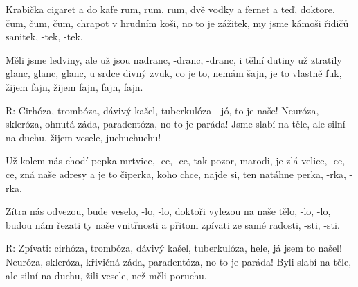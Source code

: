 \resetVars
{}
\MakeHeader
\Lyrics

Krabička cigaret a do kafe rum, rum, rum,
dvě vodky a fernet a teď, doktore, čum, čum, čum,
chrapot v hrudním koši, no to je zážitek,
my jsme kámoši řidičů sanitek, -tek, -tek.

Měli jsme ledviny, ale už jsou nadranc, -dranc, -dranc,
i tělní dutiny už ztratily glanc, glanc, glanc,
u srdce divný zvuk, co je to, nemám šajn,
je to vlastně fuk, žijem fajn, žijem fajn, fajn, fajn.

R: Cirhóza, trombóza, dávivý kašel,
tuberkulóza - jó, to je naše!
Neuróza, skleróza, ohnutá záda,
paradentóza, no to je paráda!
Jsme slabí na těle, ale silní na duchu,
žijem vesele, juchuchuchu!

Už kolem nás chodí pepka mrtvice, -ce, -ce,
tak pozor, marodi, je zlá velice, -ce, -ce,
zná naše adresy a je to čiperka,
koho chce, najde si, ten natáhne perka, -rka, -rka.

Zítra nás odvezou, bude veselo, -lo, -lo,
doktoři vylezou na naše tělo, -lo, -lo,
budou nám řezati ty naše vnitřnosti
a přitom zpívati ze samé radosti, -sti, -sti.

R: Zpívati: cirhóza, trombóza, dávivý kašel,
tuberkulóza, hele, já jsem to našel!
Neuróza, skleróza, křivičná záda,
paradentóza, no to je paráda!
Byli slabí na těle, ale silní na duchu,
žili vesele, než měli poruchu.

\Next
